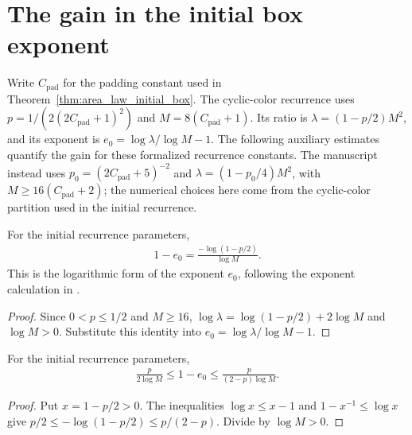 \section{The gain in the initial box exponent}
\label{sec:area_law_initial_exponent_gain}

Write $C_{\mathrm{pad}}$ for the padding constant used in
Theorem~\ref{thm:area_law_initial_box}. The cyclic-color recurrence uses
$p=1/(2(2C_{\mathrm{pad}}+1)^2)$ and $M=8(C_{\mathrm{pad}}+1)$.
Its ratio is $\lambda=(1-p/2)M^2$, and its exponent is
$e_0=\log\lambda/\log M-1$.
The following auxiliary estimates quantify the gain for these formalized
recurrence constants. The manuscript instead uses
$p_0=(2C_{\mathrm{pad}}+5)^{-2}$ and
$\lambda=(1-p_0/4)M^2$, with $M\ge16(C_{\mathrm{pad}}+2)$;
the numerical choices here come from the cyclic-color partition used
in the initial recurrence.

\begin{lemma}
    \label{thm:area_law_initial_exponent_gain}
    \leanok
    For the initial recurrence parameters,
    \begin{align}
        1-e_0=\frac{-\log(1-p/2)}{\log M}.
    \end{align}
    This is the logarithmic form of the exponent $e_0$, following the exponent
    calculation in
    \cite[proof of Proposition~3.3, lines~651--663]{OpenAI2026AreaLaw}.
\end{lemma}
\begin{proof}\leanok
    Since $0<p\le1/2$ and $M\ge16$,
    $\log\lambda=\log(1-p/2)+2\log M$ and $\log M>0$.
    Substitute this identity into $e_0=\log\lambda/\log M-1$.
\end{proof}

\begin{lemma}
    \label{thm:area_law_initial_exponent_gain_bounds}
    \leanok
    For the initial recurrence parameters,
    \begin{align}
        \frac{p}{2\log M}\le1-e_0\le\frac{p}{(2-p)\log M}.
    \end{align}
\end{lemma}
\begin{proof}\leanok
    Put $x=1-p/2>0$. The inequalities $\log x\le x-1$ and
    $1-x^{-1}\le\log x$ give
    $p/2\le-\log(1-p/2)\le p/(2-p)$.
    Divide by $\log M>0$.
\end{proof}
